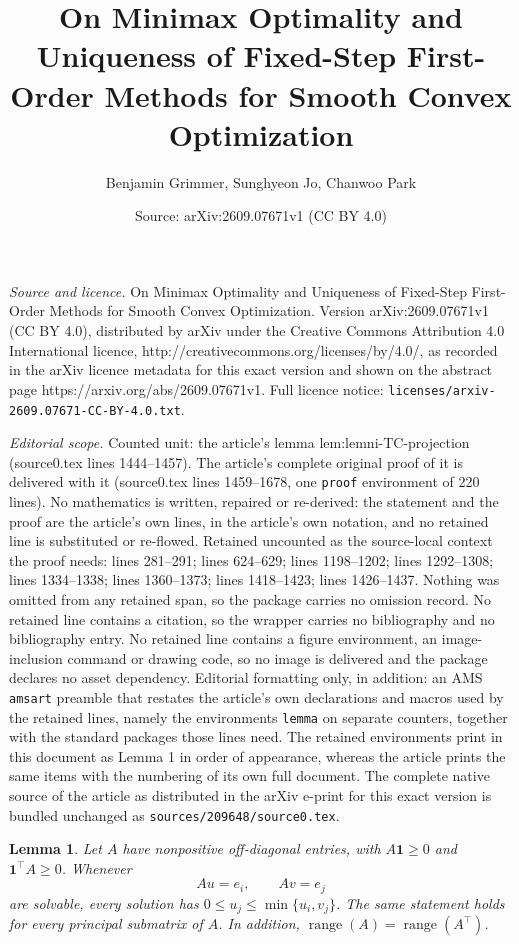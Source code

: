 \documentclass[10pt,a4paper]{amsart}
\title{On Minimax Optimality and Uniqueness of Fixed-Step First-Order Methods for Smooth Convex Optimization}
\author{Benjamin Grimmer, Sunghyeon Jo, Chanwoo Park}
\date{Source: arXiv:2609.07671v1 (CC BY 4.0)}
\newtheorem{lemma}{Lemma}
\begin{document}
\maketitle

\noindent\emph{Source and licence.} On Minimax Optimality and Uniqueness of Fixed-Step First-Order Methods for Smooth Convex Optimization. Version arXiv:2609.07671v1 (CC BY 4.0), distributed by arXiv under the Creative Commons Attribution 4.0 International licence, http://creativecommons.org/licenses/by/4.0/, as recorded in the arXiv licence metadata for this exact version and shown on the abstract page https://arxiv.org/abs/2609.07671v1. Full licence notice: \texttt{licenses/arxiv-2609.07671-CC-BY-4.0.txt}.\par\smallskip

\noindent\textit{Editorial scope.} Counted unit: the article's lemma lem:lemni-TC-projection (source0.tex lines 1444--1457). The article's complete original proof of it is delivered with it (source0.tex lines 1459--1678, one \texttt{proof} environment of 220 lines). No mathematics is written, repaired or re-derived: the statement and the proof are the article's own lines, in the article's own notation, and no retained line is substituted or re-flowed.  Retained uncounted as the source-local context the proof needs: lines 281--291; lines 624--629; lines 1198--1202; lines 1292--1308; lines 1334--1338; lines 1360--1373; lines 1418--1423; lines 1426--1437.  Nothing was omitted from any retained span, so the package carries no omission record.  No retained line contains a citation, so the wrapper carries no bibliography and no bibliography entry.  No retained line contains a figure environment, an image-inclusion command or drawing code, so no image is delivered and the package declares no asset dependency.  Editorial formatting only, in addition: an AMS \texttt{amsart} preamble that restates the article's own declarations and macros used by the retained lines, namely the environments \texttt{lemma} on separate counters, together with the standard packages those lines need.  The retained environments print in this document as Lemma 1 in order of appearance, whereas the article prints the same items with the numbering of its own full document.  The complete native source of the article as distributed in the arXiv e-print for this exact version is bundled unchanged as \texttt{sources/209648/source0.tex}.
\begin{lemma}\label{lem:app-inverse-bound}
Let $A$ have nonpositive off-diagonal entries, with
$A\mathbf1\geq0$ and $\mathbf1^\top A\geq0$. Whenever
\[
Au=e_i,
\qquad
Av=e_j
\]
are solvable, every solution has $0\leq u_j\leq\min\{u_i,v_j\}$.
The same statement holds for every principal submatrix of $A$. In addition, $\operatorname{range}(A)=\operatorname{range}(A^\top)$.
\end{lemma}
\end{document}
